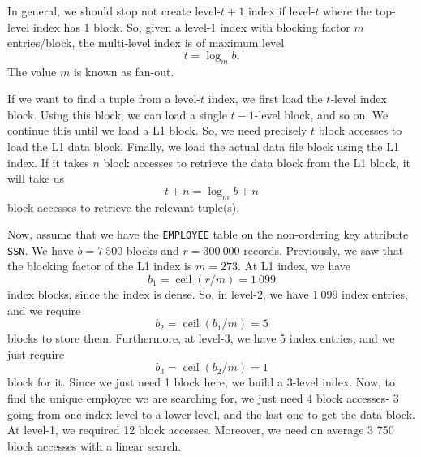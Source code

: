 \documentclass[a4paper, openany]{memoir}
\begin{document}
In general, we should stop not create level-$t+1$ index if level-$t$ where the top-level index has 1 block. So, given a level-1 index with blocking factor $m$ entries/block, the multi-level index is of maximum level
\[t = \log_m b.\]
The value $m$ is known as fan-out. 


\noindent If we want to find a tuple from a level-$t$ index, we first load the $t$-level index block. Using this block, we can load a single $t-1$-level block, and so on. We continue this until we load a L1 block. So, we need precisely $t$ block accesses to load the L1 data block. Finally, we load the actual data file block using the L1 index. If it takes $n$ block accesses to retrieve the data block from the L1 block, it will take us
\[t + n = \log_m b + n\]
block accesses to retrieve the relevant tuple(s).

Now, assume that we have the \texttt{EMPLOYEE} table on the non-ordering key attribute \texttt{SSN}. We have $b = 7 \ 500$ blocks and $r = 300 \ 000$ records. Previously, we saw that the blocking factor of the L1 index is $m = 273$. At L1 index, we have 
\[b_1 = \operatorname{ceil}(r/m) = 1 \ 099\]
index blocks, since the index is dense. So, in level-2, we have $1 \ 099$ index entries, and we require
\[b_2 = \operatorname{ceil}(b_1/m) = 5\]
blocks to store them. Furthermore, at level-3, we have $5$ index entries, and we just require
\[b_3 = \operatorname{ceil}(b_2/m) = 1\]
block for it. Since we just need 1 block here, we build a 3-level index. Now, to find the unique employee we are searching for, we just need 4 block accesses- 3 going from one index level to a lower level, and the last one to get the data block. At level-1, we required 12 block accesses. Moreover, we need on average 3 750 block accesses with a linear search.
\end{document}
